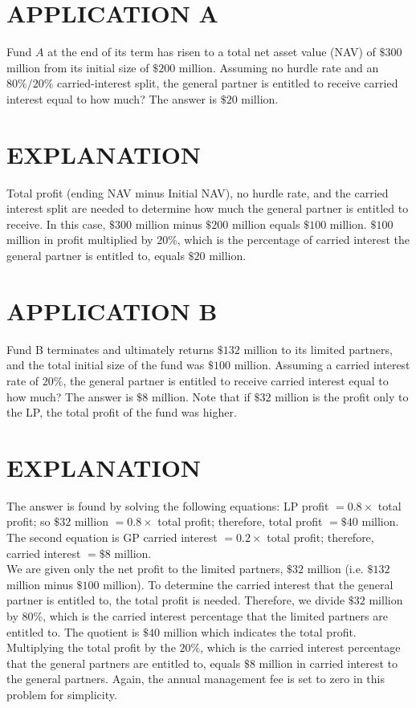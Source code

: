 \documentclass[11pt]{article}
\begin{document}
\section*{APPLICATION A}
Fund $A$ at the end of its term has risen to a total net asset value (NAV) of $\$ 300$ million from its initial size of $\$ 200$ million. Assuming no hurdle rate and an $80 \% / 20 \%$ carried-interest split, the general partner is entitled to receive carried interest equal to how much? The answer is $\$ 20$ million.

\section*{EXPLANATION}
Total profit (ending NAV minus Initial NAV), no hurdle rate, and the carried interest split are needed to determine how much the general partner is entitled to receive. In this case, $\$ 300$ million minus $\$ 200$ million equals $\$ 100$ million. $\$ 100$ million in profit multiplied by $20 \%$, which is the percentage of carried interest the general partner is entitled to, equals $\$ 20$ million.

\section*{APPLICATION B}
Fund B terminates and ultimately returns $\$ 132$ million to its limited partners, and the total initial size of the fund was $\$ 100$ million. Assuming a carried interest rate of $20 \%$, the general partner is entitled to receive carried interest equal to how much? The answer is $\$ 8$ million. Note that if $\$ 32$ million is the profit only to the LP, the total profit of the fund was higher.

\section*{EXPLANATION}
The answer is found by solving the following equations: LP profit $=0.8 \times$ total profit; so $\$ 32$ million $=0.8 \times$ total profit; therefore, total profit $=\$ 40$ million. The second equation is GP carried interest $=0.2 \times$ total profit; therefore, carried interest $=\$ 8$ million.\\
We are given only the net profit to the limited partners, $\$ 32$ million (i.e. $\$ 132$ million minus $\$ 100$ million). To determine the carried interest that the general partner is entitled to, the total profit is needed. Therefore, we divide $\$ 32$ million by $80 \%$, which is the carried interest percentage that the limited partners are entitled to. The quotient is $\$ 40$ million which indicates the total profit. Multiplying the total profit by the $20 \%$, which is the carried interest percentage that the general partners are entitled to, equals $\$ 8$ million in carried interest to the general partners. Again, the annual management fee is set to zero in this problem for simplicity.
\end{document}
